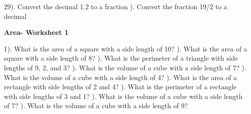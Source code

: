 \documentclass{article}%
\begin{document}
29). Convert the decimal 1.2 to a fraction%
\newline%
\newline%
). Convert the fraction 19/2 to a decimal%
\newline%
\newline%
\newline%
\pagebreak%
\large%
\begin{center}%
\textbf{Area- Worksheet 1}%
\newline%
\newline%
\newline%
\end{center} \normalsize%
1). What is the area of a square with a side length of 10?%
\newline%
\newline%
). What is the area of a square with a side length of 8?%
\newline%
\newline%
). What is the perimeter of a triangle with side lengths of 9, 2, and 3?%
\newline%
\newline%
). What is the volume of a cube with a side length of 7?%
\newline%
\newline%
). What is the volume of a cube with a side length of 4?%
\newline%
\newline%
). What is the area of a rectangle with side lengths of 2 and 4?%
\newline%
\newline%
). What is the perimeter of a rectangle with side lengths of 3 and 1?%
\newline%
\newline%
). What is the volume of a cube with a side length of 7?%
\newline%
\newline%
). What is the volume of a cube with a side length of 9?%
\newline%
\newline%
\newline%
\end{document}
